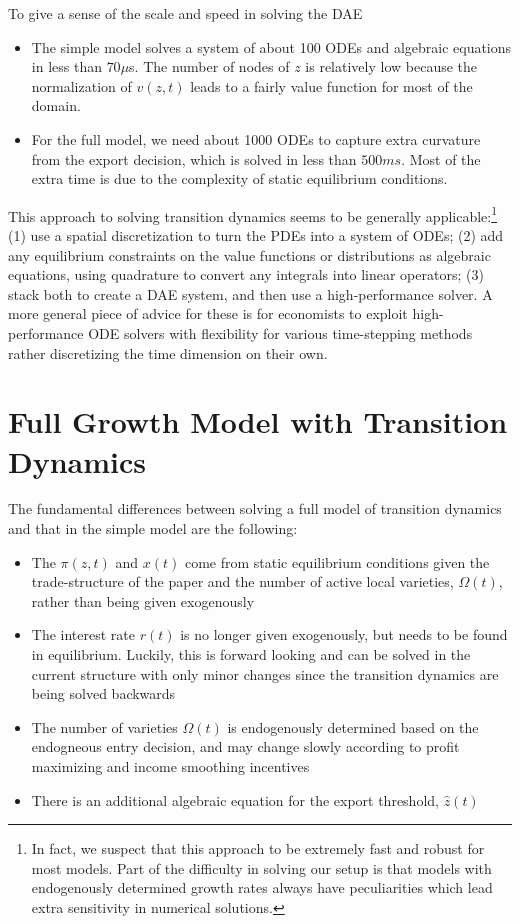 \documentclass[11pt]{article}
\begin{document}
\noindent To give a sense of the scale and speed in solving the DAE
\begin{itemize}
	\item The simple model solves a system of about 100 ODEs and algebraic equations in less than $70\mu$s.  The number of nodes of $z$ is relatively low because the normalization of $v(z,t)$ leads to a fairly value function for most of the domain.
	\item For the full model, we need about 1000 ODEs to capture extra curvature from the export decision, which is solved in less than $500ms$.  Most of the extra time is due to the complexity of static equilibrium conditions.
\end{itemize}


This approach to solving transition dynamics seems to be generally applicable:\footnote{In fact, we suspect that this approach to be extremely fast and robust for most models.  Part of the difficulty in solving our setup is that models with endogenously determined growth rates always have peculiarities which lead extra sensitivity in numerical solutions.} (1) use a spatial discretization to turn the PDEs into a system of ODEs; (2) add any equilibrium constraints on the value functions or distributions as algebraic equations, using quadrature to convert any integrals into linear operators; (3) stack both to create a DAE system, and then use a high-performance solver.  A more general piece of advice for these is for economists to exploit high-performance ODE solvers with flexibility for various time-stepping methods rather discretizing the time dimension on their own.

\section{Full Growth Model with Transition Dynamics}
The fundamental differences between solving a full model of transition dynamics and that in the simple model are the following:
\begin{itemize}
	\item The $\pi(z,t)$ and $x(t)$ come from static equilibrium conditions given the trade-structure of the paper and the number of active local varieties, $\Omega(t)$, rather than being given exogenously
	\item The interest rate $r(t)$ is no longer given exogenously, but needs to be found in equilibrium.  Luckily, this is forward looking and can be solved in the current structure with only minor changes since the transition dynamics are being solved backwards
	\item The number of varieties $\Omega(t)$ is endogenously determined based on the endogneous entry decision, and may change slowly according to profit maximizing and income smoothing incentives
	\item There is an additional algebraic equation for the export threshold, $\hat{z}(t)$
\end{itemize}
\end{document}
